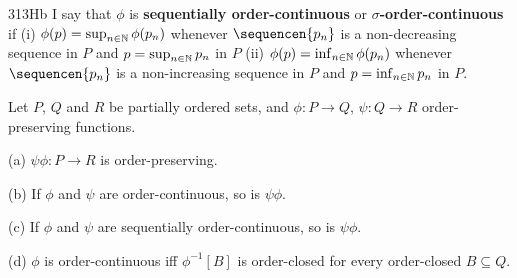 \spheader 313Hb I say that $\phi$ is {\bf sequentially order-continuous} or
{\bf $\sigma$-order-continuous} if (i)
$\phi(p)=\sup_{n\in\Bbb N}\phi(p_n)$ whenever $\sequencen{p_n}$ is a
non-decreasing sequence in $P$ and $p=\sup_{n\in\Bbb N}p_n$ in $P$ (ii)
$\phi(p)=\inf_{n\in\Bbb N}\phi(p_n)$ whenever $\sequencen{p_n}$ is a
non-increasing sequence in $P$ and $p=\inf_{n\in\Bbb N}p_n$ in $P$.


 Let $P$, $Q$ and $R$ be partially ordered
sets, and $\phi:P\to Q$, $\psi:Q\to R$ order-preserving functions.

(a) $\psi\phi:P\to R$ is order-preserving.

(b) If $\phi$ and $\psi$ are order-continuous, so is $\psi\phi$.

(c) If $\phi$ and $\psi$ are sequentially order-continuous, so is
$\psi\phi$.

(d) $\phi$ is order-continuous iff $\phi^{-1}[B]$ is order-closed for
every order-closed $B\subseteq Q$.

